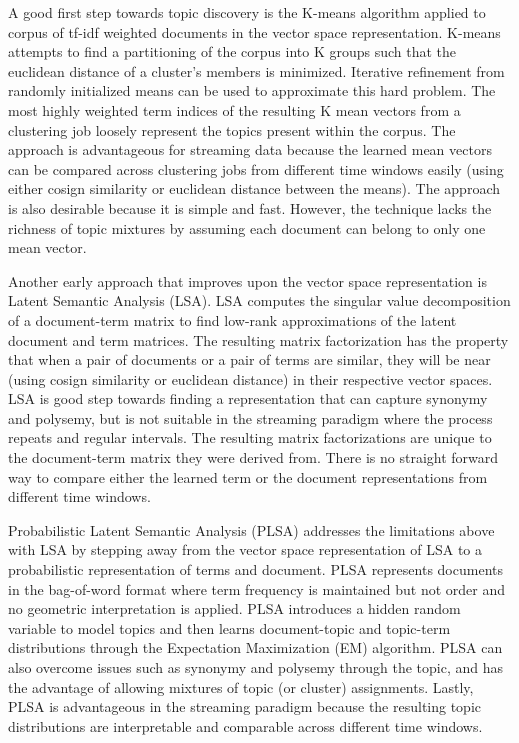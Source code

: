 \documentclass[10pt,twocolumn]{article}
\begin{document}
A good first step towards topic discovery is the K-means algorithm applied to corpus of tf-idf weighted documents in the vector space representation.  K-means attempts to find a partitioning of the corpus into K groups such that the euclidean distance of a cluster's members is minimized.  Iterative refinement from randomly initialized means can be used to approximate this hard problem.  The most highly weighted term indices of the resulting K mean vectors from a clustering job loosely represent the topics present within the corpus.  The approach is advantageous for streaming data because the learned mean vectors can be compared across clustering jobs from different time windows easily (using either cosign similarity or euclidean distance between the means).  The approach is also desirable because it is simple and fast.  However, the technique lacks the richness of topic mixtures by assuming each document can belong to only one mean vector. 

Another early approach that improves upon the vector space representation is Latent Semantic Analysis (LSA).  LSA computes the singular value decomposition of a document-term matrix to find low-rank approximations of the latent document and term matrices.  The resulting matrix factorization has the property that when a pair of documents or a pair of terms are similar, they will be near (using cosign similarity or euclidean distance) in their respective vector spaces.  LSA is good step towards finding a representation that can capture synonymy and polysemy, but is not suitable in the streaming paradigm where the process repeats and regular intervals.  The resulting matrix factorizations are unique to the document-term matrix they were derived from.  There is no straight forward way to compare either the learned term or the document representations from different time windows.

Probabilistic Latent Semantic Analysis (PLSA) addresses the limitations above with LSA by stepping away from the vector space representation of LSA to a probabilistic representation of terms and document.  PLSA represents documents in the bag-of-word format where term frequency is maintained but not order and no geometric interpretation is applied. PLSA introduces a hidden random variable to model topics and then learns document-topic and topic-term distributions through the Expectation Maximization (EM) algorithm.  PLSA can also overcome issues such as synonymy and polysemy through the topic, and has the advantage of allowing mixtures of topic (or cluster) assignments.  Lastly, PLSA is advantageous in the streaming paradigm because the resulting topic distributions are interpretable and comparable across different time windows. 
\end{document}
